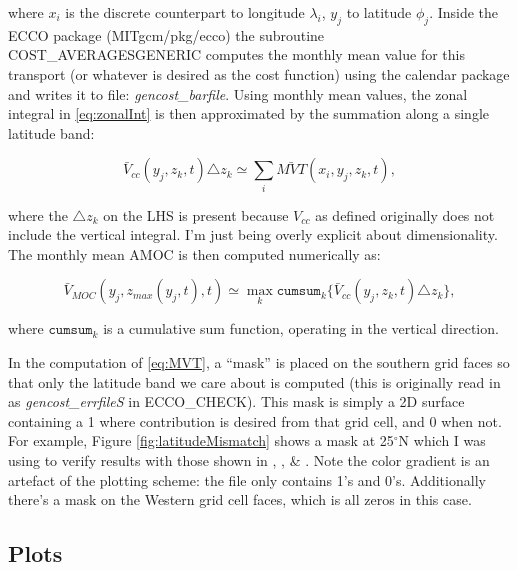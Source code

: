\documentclass[a4paper,11pt]{article}
\newcommand{\red}[1]{\textcolor{red}{#1}}
\begin{document}
  where $x_i$ is the discrete counterpart to longitude $\lambda_i$, $y_j$ to latitude $\phi_j$. Inside the ECCO package (MITgcm/pkg/ecco) the subroutine COST\_AVERAGESGENERIC computes the monthly mean value for this transport  (or whatever is desired as the cost function) using the calendar package and writes it to file: \textit{gencost\_barfile}. Using monthly mean values, the zonal integral in \ref{eq:zonalInt} is then approximated by the summation along a single latitude band: 
  
  \begin{equation}
   \bar{V}_{cc}(y_j,z_k,t) \triangle z_k \simeq \sum_i \bar{MVT}(x_i,y_j,z_k,t) ,
   \label{eq:vccApprox}
  \end{equation}

  where the $\triangle z_k$ on the LHS is present because $V_{cc}$ as defined originally does not include the vertical integral. I'm just being overly explicit about dimensionality. 
  The monthly mean AMOC is then computed numerically as: 
  
  \begin{equation}
   \bar{V}_{MOC}(y_j,z_{max}(y_j,t),t) \simeq \max_{k} \texttt{cumsum}_k \{\bar{V}_{cc}(y_j,z_k,t)\triangle z_k\} ,
   \label{eq:amocApprox}
  \end{equation}

  where $\texttt{cumsum}_k$ is a cumulative sum function, operating in the vertical direction. 
  
  In the computation of \ref{eq:MVT}, a ``mask'' is placed on the southern grid faces so that only the latitude band we care about is computed (this is originally read in as \textit{gencost\_errfileS} in ECCO\_CHECK). This mask is simply a 2D surface containing a 1 where contribution is desired from that grid cell, and 0 when not. For example, Figure \ref{fig:latitudeMismatch} shows a mask at 25$^\circ$N which I was using to verify results with those shown in \cite{wunschLinear}, \cite{wunschAndHeimbach_AMOC}, \& \cite{mcCarthy}. Note the color gradient is an artefact of the plotting scheme: the file only contains 1's and 0's. Additionally there's a mask on the Western grid cell faces, which is all zeros in this case. 
  
  \subsection{Plots}
  
  
  
  
\end{document}
